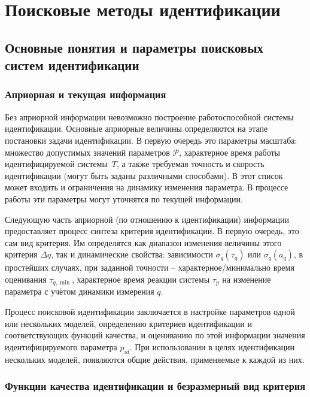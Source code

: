 \chapter{Поисковые методы идентификации}

\section{Основные понятия и параметры поисковых систем идентификации}  %

\subsection{Априорная и текущая информация}  %

Без априорной информации невозможно построение
работоспособной системы идентификации. Основные
априорные величины определяются на этапе постановки
задачи идентификации. В первую очередь это
параметры масштаба: множество допустимых
значений параметров \( \mathcal{P}\),
характерное время работы
идентифицируемой системы~$T$, а также
требуемая точность и скорость идентификации
(могут быть заданы различными способами).
В этот список может входить и ограничения на динамику изменения параметра.
В процессе работы эти параметры могут уточнятся по текущей информации.

Следующую часть априорной (по отношению к идентификации) информации
предоставляет процесс синтеза критерия идентификации.
В первую очередь, это сам вид критерия. Им определятся
как диапазон изменения величины этого критерия $\Delta q$, так и
динамические свойства:
зависимости $\sigma_q(\tau_q)$ или  $\sigma_q(a_q)$,
в простейших случаях, при заданной точности -- характерное/минимально время
оценивания \(\tau_{q,\min}\),
характерное время реакции системы $\tau_p$ на изменение
параметра с учётом динамики измерения \(q\).

Процесс поисковой идентификации заключается в настройке параметров одной
или нескольких моделей, определению критериев идентификации
и соответствующих функций качества, и оцениванию по этой информации
значения идентифицируемого параметра $p_{id}$.
При использовании в целях идентификации нескольких моделей,
появляются общие действия, применяемые к каждой из них.



\subsection{Функции качества идентификации и безразмерный вид критерия}  %


